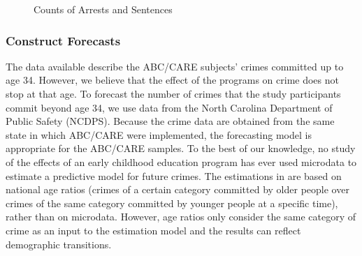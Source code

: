\begin{figure}[H]
\caption{Counts of Arrests and Sentences}
\centering \label{fig:datagraph}
{}
\end{figure}

\subsubsection{Construct Forecasts}

\noindent The data available describe the ABC/CARE subjects' crimes committed up to age 34. However, we believe that the effect of the programs on crime does not stop at that age. To forecast the number of crimes that the study participants commit beyond age 34, we use data from the North Carolina Department of Public Safety (NCDPS). Because the crime data are obtained from the same state in which ABC/CARE were implemented, the forecasting model is appropriate for the ABC/CARE samples. To the best of our knowledge, no study of the effects of an early childhood education program has ever used microdata to estimate a predictive model for future crimes. The estimations in \cite{Heckman_Moon_etal_2010_RateofReturn} are based on national age ratios (crimes of a certain category committed by older people over crimes of the same category committed by younger people at a specific time), rather than on microdata. However, age ratios only consider the same category of crime as an input to the estimation model and the results can reflect demographic transitions.


